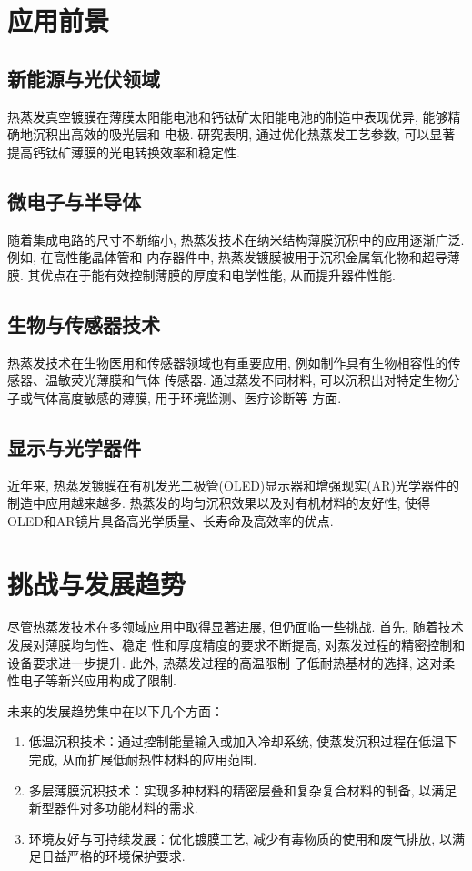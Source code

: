 \documentclass[UTF8]{ctexart}
\begin{document}
\section{应用前景}
\subsection{新能源与光伏领域}
热蒸发真空镀膜在薄膜太阳能电池和钙钛矿太阳能电池的制造中表现优异, 能够精确地沉积出高效的吸光层和
电极. 研究表明, 通过优化热蒸发工艺参数, 可以显著提高钙钛矿薄膜的光电转换效率和稳定性. 
\subsection{微电子与半导体}
随着集成电路的尺寸不断缩小, 热蒸发技术在纳米结构薄膜沉积中的应用逐渐广泛. 例如, 在高性能晶体管和
内存器件中, 热蒸发镀膜被用于沉积金属氧化物和超导薄膜. 其优点在于能有效控制薄膜的厚度和电学性能, 
从而提升器件性能. 
\subsection{生物与传感器技术}
热蒸发技术在生物医用和传感器领域也有重要应用, 例如制作具有生物相容性的传感器、温敏荧光薄膜和气体
传感器. 通过蒸发不同材料, 可以沉积出对特定生物分子或气体高度敏感的薄膜, 用于环境监测、医疗诊断等
方面. 
\subsection{显示与光学器件}
近年来, 热蒸发镀膜在有机发光二极管(OLED)显示器和增强现实(AR)光学器件的制造中应用越来越多. 
热蒸发的均匀沉积效果以及对有机材料的友好性, 使得OLED和AR镜片具备高光学质量、长寿命及高效率的优点. 
\section{挑战与发展趋势}
尽管热蒸发技术在多领域应用中取得显著进展, 但仍面临一些挑战. 首先, 随着技术发展对薄膜均匀性、稳定
性和厚度精度的要求不断提高, 对蒸发过程的精密控制和设备要求进一步提升. 此外, 热蒸发过程的高温限制
了低耐热基材的选择, 这对柔性电子等新兴应用构成了限制. \par
未来的发展趋势集中在以下几个方面：
\begin{enumerate}
    \item 低温沉积技术：通过控制能量输入或加入冷却系统, 使蒸发沉积过程在低温下完成, 从而扩展低耐热性材料的应用范围. 
    \item 多层薄膜沉积技术：实现多种材料的精密层叠和复杂复合材料的制备, 以满足新型器件对多功能材料的需求. 
    \item 环境友好与可持续发展：优化镀膜工艺, 减少有毒物质的使用和废气排放, 以满足日益严格的环境保护要求. 
\end{enumerate}
\end{document}
